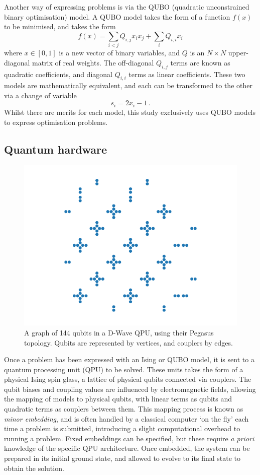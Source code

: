 \documentclass[12pt]{article}
\theoremstyle{definition}
\begin{document}
Another way of expressing problems is via the QUBO (quadratic unconstrained binary optimisation) model. A QUBO model takes the form of a function $f(x)$ to be minimised, and takes the form
\begin{equation}
    f(x)=\sum_{i<j}Q_{i,j}x_ix_j + \sum_iQ_{i,i}x_i
    \label{eq:qubo}
\end{equation}
where $x\in[0,1]$ is a new vector of binary variables, and $Q$ is an $N\times N$ upper-diagonal matrix of real weights. The off-diagonal $Q_{i,j}$ terms are known as quadratic coefficients, and diagonal $Q_{i,i}$ terms as linear coefficients. These two models are mathematically equivalent, and each can be transformed to the other via a change of variable
\begin{equation}
    s_i = 2x_i - 1 \,.
    \label{eq:qubo-ising}
\end{equation}
Whilst there are merits for each model, this study exclusively uses QUBO models to express optimisation problems.

\subsection{Quantum hardware}

\begin{figure}[b]
    \centering
    \includegraphics[width=0.5\linewidth]{../Figures/pegasus.pdf}
    \caption[A graph of \num{144} qubits in a D-Wave QPU.]{A graph of \num{144} qubits in a D-Wave QPU, using their Pegasus topology. Qubits are represented by vertices, and couplers by edges.}
    \label{fig:pegasus}
\end{figure}

Once a problem has been expressed with an Ising or QUBO model, it is sent to a quantum processing unit (QPU) to be solved. These units takes the form of a physical Ising spin glass, a lattice of physical qubits connected via couplers. The qubit biases and coupling values are influenced by electromagnetic fields, allowing the mapping of models to physical qubits, with linear terms as qubits and quadratic terms as couplers between them. This mapping process is known as \emph{minor embedding}, and is often handled by a classical computer `on the fly' each time a problem is submitted, introducing a slight computational overhead to running a problem. Fixed embeddings can be specified, but these require \textit{a priori} knowledge of the specific QPU architecture. Once embedded, the system can be prepared in its initial ground state, and allowed to evolve to its final state to obtain the solution.
\end{document}
